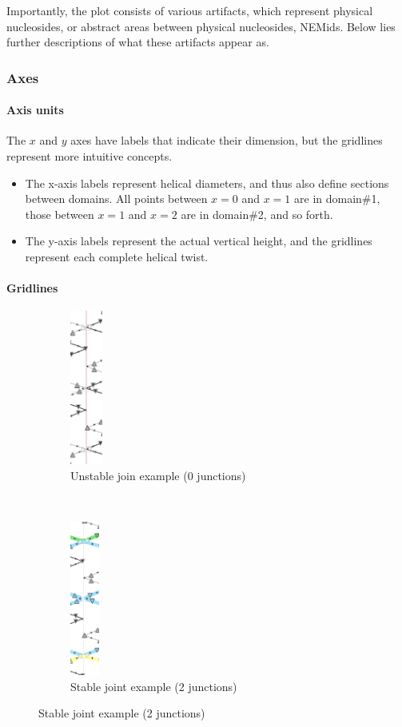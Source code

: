 \documentclass[titlepage]{article}
\begin{document}
Importantly, the plot consists of various artifacts, which represent physical nucleosides, or abstract areas between physical nucleosides, NEMids. Below lies further descriptions of what these artifacts appear as.

\subsubsection{Axes}

\paragraph{Axis units}
The $x$ and $y$ axes have labels that indicate their dimension, but the gridlines represent more intuitive concepts.

\begin{itemize}
	\item The x-axis labels represent helical diameters, and thus also define sections between domains. All points between $x=0$ and $x=1$ are in domain\#1, those between $x=1$ and $x=2$ are in domain\#2, and so forth.
	\item The y-axis labels represent the actual vertical height, and the gridlines represent each complete helical twist.
\end{itemize}

\paragraph{Gridlines}

\begin{figure}[H]
	\centering
	\begin{subfigure}{.4\linewidth}
		\centering
		\caption{Unstable join example (0 junctions)}
		\includegraphics[height=2in]{unstable-joint-example.png}
	\end{subfigure}~
	\begin{subfigure}{.4\linewidth}
		\centering
		\caption{Stable joint example (2 junctions)}
		\includegraphics[height=2in]{stable-joint-example.png}
	\end{subfigure}
\end{figure}
\end{document}

